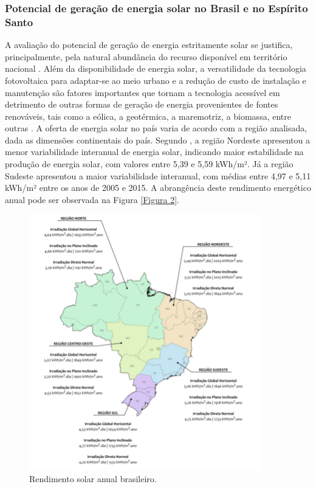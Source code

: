 \begin{onehalfspace}
\subsubsection{Potencial de geração de energia solar no Brasil e no Espírito Santo}
\noindent A avaliação do potencial de geração de energia estritamente solar se  justifica, principalmente, pela natural abundância do recurso disponível em território nacional \cite{Pereira2017}. Além da disponibilidade de energia solar, a versatilidade da tecnologia fotovoltaica para adaptar-se ao meio urbano e a redução de custo de instalação e manutenção são fatores importantes que tornam a tecnologia acessível em detrimento de outras formas de geração de energia provenientes de fontes renováveis, tais como a eólica, a geotérmica, a maremotriz, a biomassa, entre outras \cite{AgenciadeRegulacaodeServicosPublicosdoEspiritoSanto-ARSP2019,Didone2014,Didone2014a,InternationalEnergyAgency-IEA2019b,UnitedNationsEnvironmentProgramme-UNEP2019}.\vspace{0.3cm} \newline
A oferta de energia solar no país varia de acordo com a região analisada, dada as dimensões continentais do país. Segundo \textcite{Pereira2017}, a região Nordeste apresentou a menor variabilidade interanual de energia solar, indicando maior estabilidade na produção de energia solar, com valores entre 5,39 e 5,59 kWh/m². Já a região Sudeste apresentou a maior variabilidade interanual, com médias entre 4,97 e 5,11 kWh/m² entre os anos de 2005 e 2015. A abrangência deste rendimento energético anual pode ser observada na Figura \ref{Figura 2}.\pagebreak
    \begin{figure}[H]
        \centering
        \caption{\small Rendimento solar anual brasileiro.}
        \includegraphics[width=0.9\textwidth]{figures/fig3-niveis_de_irradiacao_por_regiao_brasileira_pereira_et_al_2017.png}

\end{figure}
\end{onehalfspace}
